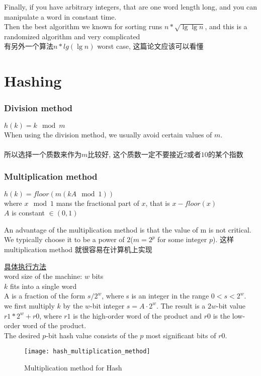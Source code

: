 \documentclass{article}
\begin{document}
Finally, if you have arbitrary integers, that are one word length long, and you can manipulate a word in constant time.\\
Then the best algorithm we known for sorting runs $n*\sqrt{\lg\lg n }$, and this is a randomized algorithm and very complicated\\
有另外一个算法$n*lg(\lg n )$ worst case, 这篇论文应该可以看懂

\section{Hashing}
\subsubsection{Division method}
$h(k)=k \mod m$\\
When using the division method, we usually avoid certain values of $m$.\\
\\
所以选择一个质数来作为$m$比较好, 这个质数一定不要接近$2$或者$10$的某个指数

\subsubsection{Multiplication method}
$h(k)=floor(m(kA\mod 1))$\\
where $x \mod 1$ mans the fractional part of $x$, that is $x - floor(x)$\\
$A$ is constant $\in (0,1)$

An advantage of the multiplication method is that the value of m is not critical. We typically choose it to be a power of $2$($m=2^p$ for some integer $p$). 这样multiplication method 就很容易在计算机上实现

\underline{具体执行方法}\\
word size of the machine: $w$ bits\\
$k$ fits into a single word\\
A is a fraction of the form $s/2^w$, where s is an integer in the range $0 < s < 2^w$. \\
we first multiply $k$ by the $w$-bit integer $s = A \cdot 2^w$. The result is a $2w$-bit value $r1*2^w + r0$, where $r1$ is the high-order word of the product and $r0$ is the low-order word of the product. \\
The desired $p$-bit hash value consists of the $p$ most significant bits of $r0$.\\
\begin{figure}[htbp]
  \centering
  \texttt{[image: hash\_multiplication\_method]}\\
  \caption{Multiplication method for Hash}\label{fig.hash.mult}
\end{figure}
\end{document}
